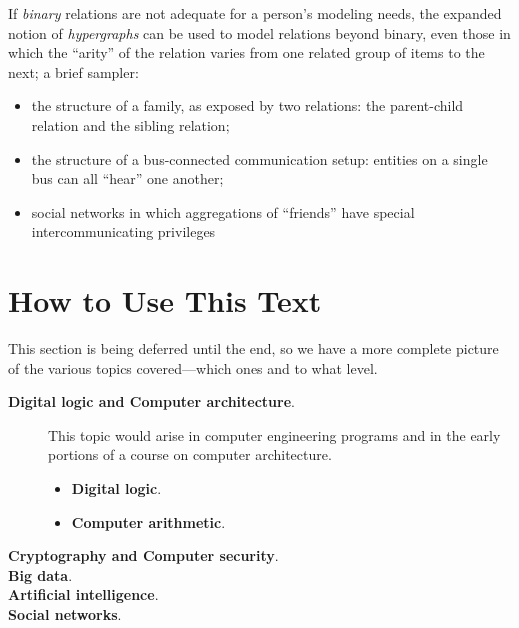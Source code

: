 
\medskip

If {\em binary} relations are not adequate for a person's modeling
needs, the expanded notion of {\em hypergraphs} can be used to model
relations beyond binary, even those in which the ``arity'' of the
relation varies from one related group of items to the next; a brief
sampler:
\begin{itemize}
\item
the structure of a family, as exposed by two relations: the
parent-child relation and the sibling relation;
\item
the structure of a bus-connected communication setup: entities on a
single bus can all ``hear'' one another;
\item
social networks in which aggregations of ``friends'' have special
intercommunicating privileges
\end{itemize}


\section{How to Use This Text}
\label{sec:how-to-use}

{\Arny This section is being deferred until the end, so we have a
more complete picture of the various topics covered---which ones and
to what level.}

\begin{description}
\item[{\bf Digital logic and Computer architecture}.]
 
This topic would arise in computer engineering programs and in the
early portions of a course on computer architecture.
\begin{itemize}
\item
{\bf Digital logic}. 
\item
{\bf Computer arithmetic}.  
\end{itemize}

\item[{\bf Cryptography and Computer security}.]


\item[{\bf Big data}.]


\item[{\bf Artificial intelligence}.]


\item[{\bf Social networks}.]

\end{description}





